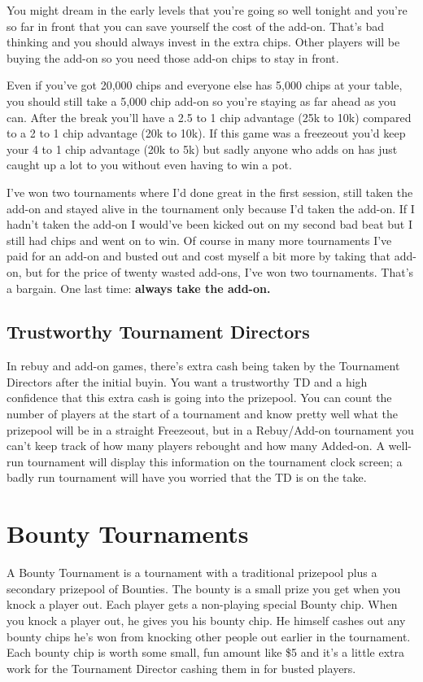 You might dream in the early levels that you're going so well
tonight and you're so far in front that you can save yourself
the cost of the add-on. That's bad thinking and you should always
invest in the extra chips. Other players will be buying the add-on
so you need those add-on chips to stay in front.

Even if you've got 20,000 chips and everyone else has 5,000 chips at
your table, you should still take a 5,000 chip add-on so you're staying
as far ahead as you can. After the break you'll have a 2.5 to 1 chip
advantage (25k to 10k) compared to a 2 to 1 chip advantage (20k to 10k).
If this game was a freezeout you'd keep your 4 to 1 chip advantage
(20k to 5k) but sadly anyone who adds on has just caught up a lot to you
without even having to win a pot.

I've won two tournaments where I'd done great in the first session,
still taken the add-on and stayed alive in the tournament only because
I'd taken the add-on. If I hadn't taken the add-on I would've been
kicked out on my second bad beat but I still had chips
and went on to win. Of course in many more tournaments
I've paid for an add-on and busted out and cost myself a bit more by
taking that add-on, but for the price of twenty wasted add-ons, I've won two
tournaments. That's a bargain. One last time: \textbf{always take the add-on.}

\subsection{Trustworthy Tournament Directors}

In rebuy and add-on games, there's extra cash being taken by
the Tournament Directors after the initial buyin. You want
a trustworthy TD and a high confidence that this extra cash is
going into the prizepool. You can count the number of players
at the start of a tournament and know pretty well what the prizepool
will be in a straight Freezeout, but in a Rebuy/Add-on tournament
you can't keep track of how many players rebought and how
many Added-on. A well-run tournament will display this
information on the tournament clock screen; a badly run tournament
will have you worried that the TD is on the take.

\section{Bounty Tournaments}

A Bounty Tournament is a tournament with a traditional prizepool
plus a secondary prizepool of Bounties. The bounty
is a small prize you get when you knock a player out.
Each player gets a non-playing special Bounty chip.
When you knock a player out, he gives you his bounty chip.
He himself cashes out any bounty chips he's won from knocking
other people out earlier in the tournament. Each bounty chip is worth
some small, fun amount like \$5 and it's a little extra work for the
Tournament Director cashing them in for busted players.

